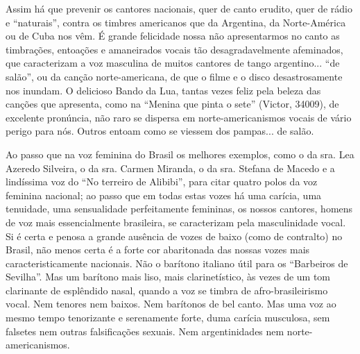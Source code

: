 Assim há que prevenir os cantores nacionais, quer de canto erudito, quer
de rádio e ``naturais'', contra os timbres americanos que da Argentina,
da Norte-América ou de Cuba nos vêm. É grande felicidade nossa não
apresentarmos no canto as timbrações, entoações e amaneirados vocais tão
desagradavelmente afeminados, que caracterizam a voz masculina de muitos
cantores de tango argentino... ``de salão'', ou da canção
norte-americana, de que o filme e o disco desastrosamente nos inundam. O
delicioso Bando da Lua, tantas vezes feliz pela beleza das canções que
apresenta, como na ``Menina que pinta o sete'' (Victor, 34009), de
excelente pronúncia, não raro se dispersa em norte-americanismos vocais
de vário perigo para nós. Outros entoam como se viessem dos pampas... de
salão.

Ao passo que na voz feminina do Brasil os melhores exemplos, como o da
sra. Lea Azeredo Silveira, o da sra. Carmen Miranda, o da sra. Stefana
de Macedo e a lindíssima voz do ``No terreiro de Alibibi'', para citar
quatro polos da voz feminina nacional; ao passo que em todas estas vozes
há uma carícia, uma tenuidade, uma sensualidade perfeitamente femininas,
os nossos cantores, homens de voz mais essencialmente brasileira, se
caracterizam pela masculinidade vocal. Si é certa e penosa a grande
ausência de vozes de baixo (como de contralto) no Brasil, não menos
certa é a forte cor abaritonada das nossas vozes mais
caracteristicamente nacionais. Não o barítono italiano útil para os
``Barbeiros de Sevilha''. Mas um barítono mais liso, mais
clarinetístico, às vezes de um tom clarinante de esplêndido nasal,
quando a voz se timbra de afro-brasileirismo vocal. Nem tenores nem
baixos. Nem barítonos de bel canto. Mas uma voz ao mesmo tempo
tenorizante e serenamente forte, duma carícia musculosa, sem falsetes
nem outras falsificações sexuais. Nem argentinidades nem
norte-americanismos.

